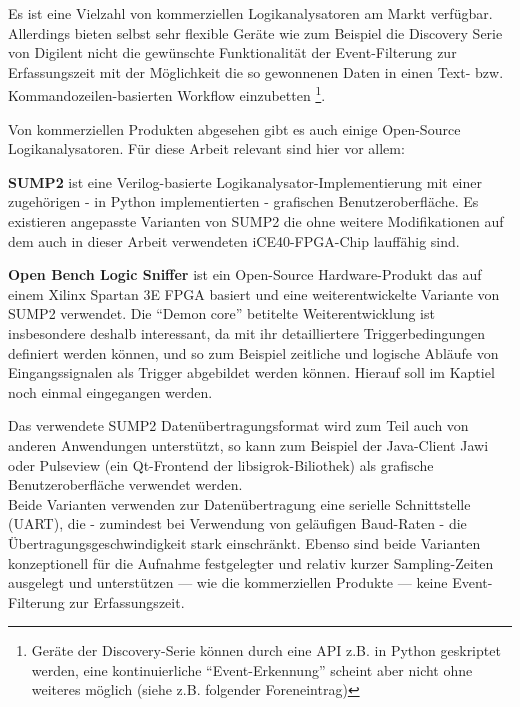 Es ist eine Vielzahl von kommerziellen Logikanalysatoren am Markt verfügbar. Allerdings bieten selbst sehr flexible Geräte wie zum Beispiel die Discovery Serie von Digilent nicht die gewünschte Funktionalität der Event-Filterung zur Erfassungszeit mit der Möglichkeit die so gewonnenen Daten in einen Text- bzw. Kommandozeilen-basierten Workflow einzubetten \footnote{Geräte der Discovery-Serie können durch eine \acrshort{API} z.B. in Python geskriptet werden, eine kontinuierliche ``Event-Erkennung'' scheint aber nicht ohne weiteres möglich (siehe z.B. folgender Foreneintrag\cite{forum:digilent}) }. 

Von kommerziellen Produkten abgesehen gibt es auch einige Open-Source Logikanalysatoren. Für diese Arbeit relevant sind hier vor allem:
\begin{description}
	\item \textbf{SUMP2} ist eine \gls{Verilog}-basierte Logikanalysator-Implementierung mit einer zugehörigen - in Python implementierten - grafischen Benutzeroberfläche. Es existieren angepasste Varianten von SUMP2 die ohne weitere Modifikationen auf dem auch in dieser Arbeit verwendeten iCE40-FPGA-Chip lauffähig sind\cite{web:blackmesa_sump2}.  
	\item \textbf{Open Bench Logic Sniffer} ist ein Open-Source Hardware-Produkt das auf einem Xilinx Spartan 3E FPGA basiert und eine weiterentwickelte Variante von SUMP2 verwendet. Die ``Demon core'' betitelte Weiterentwicklung ist insbesondere deshalb interessant, da mit ihr detailliertere Triggerbedingungen definiert werden können, und so zum Beispiel zeitliche und logische Abläufe von Eingangssignalen als Trigger abgebildet werden können. Hierauf soll im Kaptiel  noch einmal eingegangen werden.
\end{description}

Das verwendete SUMP2 Datenübertragungsformat wird zum Teil auch von anderen Anwendungen unterstützt, so kann zum Beispiel der Java-Client Jawi\cite{web:ols} oder Pulseview\cite{web:sigrok_ols} (ein Qt-Frontend der libsigrok-Biliothek) als grafische Benutzeroberfläche verwendet werden.\\ 
Beide Varianten verwenden zur Datenübertragung eine serielle Schnittstelle (\acrshort{UART}), die - zumindest bei Verwendung von geläufigen Baud-Raten - die Übertragungsgeschwindigkeit stark einschränkt. Ebenso sind beide Varianten konzeptionell für die Aufnahme festgelegter und relativ kurzer Sampling-Zeiten ausgelegt und unterstützen --- wie die kommerziellen Produkte --- keine Event-Filterung zur Erfassungszeit.  

